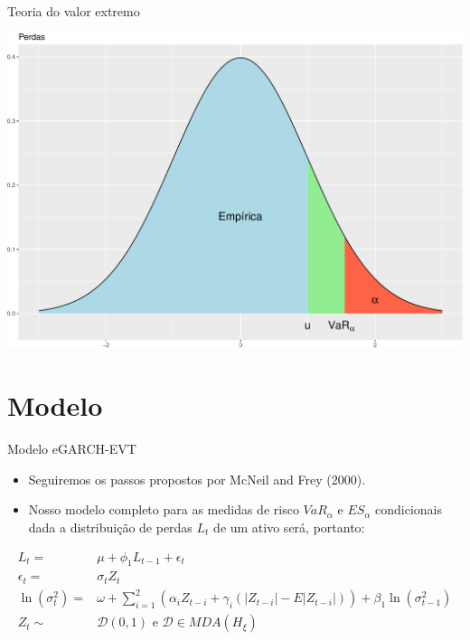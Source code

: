 \documentclass[ignorenonframetext,]{beamer}
\providecommand{\tightlist}{%
\setlength{\itemsep}{0pt}\setlength{\parskip}{0pt}}
\begin{document}
\begin{frame}{Teoria do valor extremo}

\includegraphics{artigo-apresentacao_files/figure-beamer/pot-1.pdf}

\end{frame}

\section{Modelo}\label{modelo}

\begin{frame}{Modelo eGARCH-EVT}

\begin{itemize}
\tightlist
\item
  Seguiremos os passos propostos por McNeil and Frey (2000).
\item
  Nosso modelo completo para as medidas de risco \(VaR_\alpha\) e
  \(ES_\alpha\) condicionais dada a distribuição de perdas \(L_t\) de um
  ativo será, portanto:
\end{itemize}

\begin{align*}
L_t=&\mu+ \phi_1 L_{t-1}+ \epsilon_t \\
\epsilon_t=&\sigma_t Z_t\\
\ln(\sigma_t^2)=&\omega+ \sum_{i=1}^{2}(\alpha_i Z_{t-i}+ \gamma_i(|Z_{t-i}|-E|Z_{t-i}|))+ \beta_1 \ln(\sigma_{t-1}^2) \\
Z_t\sim &\mathcal{D}(0,1) \text{ e } \mathcal{D} \in MDA(H_\xi)
\end{align*}

\end{frame}
\end{document}
